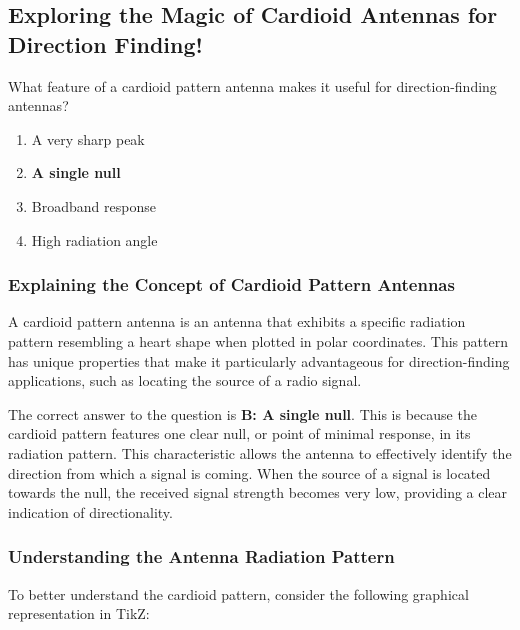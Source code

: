 \subsection{Exploring the Magic of Cardioid Antennas for Direction Finding!}

\begin{tcolorbox}[colback=gray!10, colframe=black, title=E9H11] What feature of a cardioid pattern antenna makes it useful for direction-finding antennas? 
\begin{enumerate}[label=\Alph*)]
    \item A very sharp peak
    \item \textbf{A single null}
    \item Broadband response
    \item High radiation angle
\end{enumerate} \end{tcolorbox}

\subsubsection{Explaining the Concept of Cardioid Pattern Antennas}

A cardioid pattern antenna is an antenna that exhibits a specific radiation pattern resembling a heart shape when plotted in polar coordinates. This pattern has unique properties that make it particularly advantageous for direction-finding applications, such as locating the source of a radio signal.

The correct answer to the question is 
\textbf{B: A single null}. This is because the cardioid pattern features one clear null, or point of minimal response, in its radiation pattern. This characteristic allows the antenna to effectively identify the direction from which a signal is coming. When the source of a signal is located towards the null, the received signal strength becomes very low, providing a clear indication of directionality.

\subsubsection{Understanding the Antenna Radiation Pattern}

To better understand the cardioid pattern, consider the following graphical representation in TikZ:

\begin{center}
\end{center}

